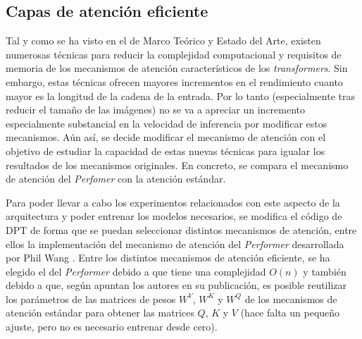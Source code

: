 


\subsection{Capas de atención eficiente}

Tal y como se ha visto en el  de Marco Teórico y Estado del Arte, existen numerosas técnicas para reducir la complejidad computacional y requisitos de memoria de los mecanismos de atención característicos de los \textit{transformers}. Sin embargo, estas técnicas ofrecen mayores incrementos en el rendimiento cuanto mayor es la longitud de la cadena de la entrada. Por lo tanto (especialmente tras reducir el tamaño de las imágenes) no se va a apreciar un incremento especialmente substancial en la velocidad de inferencia por modificar estos mecanismos. Aún así, se decide modificar el mecanismo de atención con el objetivo de estudiar la capacidad de estas nuevas técnicas para igualar los resultados de los mecanismos originales. En concreto, se compara el mecanismo de atención del \textit{Perfomer} con la atención estándar.

Para poder llevar a cabo los experimentos relacionados con este aspecto de la arquitectura y poder entrenar los modelos necesarios, se modifica el código de DPT de forma que se puedan seleccionar distintos mecanismos de atención, entre ellos la implementación del mecanismo de atención del \textit{Performer} desarrollada por Phil Wang \cite{pwperformer}. Entre los distintos mecanismos de atención eficiente, se ha elegido el del \textit{Performer} debido a que tiene una complejidad $O(n)$ y también debido a que, según apuntan los autores en su publicación, es posible reutilizar los parámetros de las matrices de pesos $W^V$, $W^K$ y $W^Q$ de los mecanismos de atención estándar para obtener las matrices $Q$, $K$ y $V$ (hace falta un pequeño ajuste, pero no es necesario entrenar desde cero).

